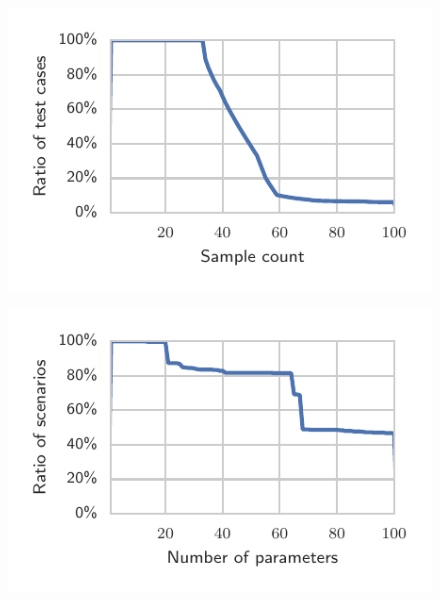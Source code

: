 \centering
\begin{subfigure}[h]{.45\textwidth}
  \centering
  \includegraphics{img/num_samples}
  \caption{}
  \label{fig:sample-counts}
\end{subfigure}
\hfill
\begin{subfigure}[h]{.45\textwidth}
  \centering
  \includegraphics{img/num_params}
  \caption{}
  \label{fig:param-counts}
\end{subfigure}

